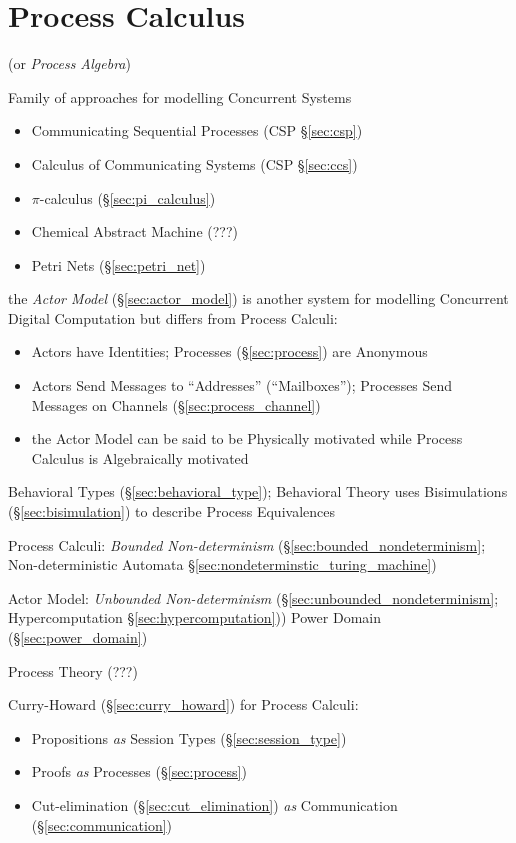 \section{Process Calculus}\label{sec:process_calculus}

(or \emph{Process Algebra})

Family of approaches for modelling Concurrent Systems

\begin{itemize}
\item Communicating Sequential Processes (CSP \S\ref{sec:csp})
\item Calculus of Communicating Systems (CSP \S\ref{sec:ccs})
\item $\pi$-calculus (\S\ref{sec:pi_calculus})
\item Chemical Abstract Machine (???)
\item Petri Nets (\S\ref{sec:petri_net})
\end{itemize}

\fist the \emph{Actor Model} (\S\ref{sec:actor_model}) is
another system for modelling Concurrent Digital Computation but
differs from Process Calculi:
\begin{itemize}
  \item Actors have Identities; Processes (\S\ref{sec:process}) are
    Anonymous
  \item Actors Send Messages to ``Addresses'' (``Mailboxes'');
    Processes Send Messages on Channels (\S\ref{sec:process_channel})
  \item the Actor Model can be said to be Physically motivated while
    Process Calculus is Algebraically motivated
\end{itemize}

\fist Behavioral Types (\S\ref{sec:behavioral_type}); Behavioral
Theory uses Bisimulations (\S\ref{sec:bisimulation}) to describe
Process Equivalences


Process Calculi: \emph{Bounded Non-determinism}
(\S\ref{sec:bounded_nondeterminism}; \fist Non-deterministic Automata
\S\ref{sec:nondeterminstic_turing_machine})

Actor Model: \emph{Unbounded Non-determinism}
(\S\ref{sec:unbounded_nondeterminism}; \fist Hypercomputation
\S\ref{sec:hypercomputation})) Power Domain (\S\ref{sec:power_domain})

Process Theory (???)

Curry-Howard (\S\ref{sec:curry_howard}) for Process Calculi:
\begin{itemize}
  \item Propositions \emph{as} Session Types (\S\ref{sec:session_type})
  \item Proofs \emph{as} Processes (\S\ref{sec:process})
  \item Cut-elimination (\S\ref{sec:cut_elimination}) \emph{as}
    Communication (\S\ref{sec:communication})
\end{itemize}

